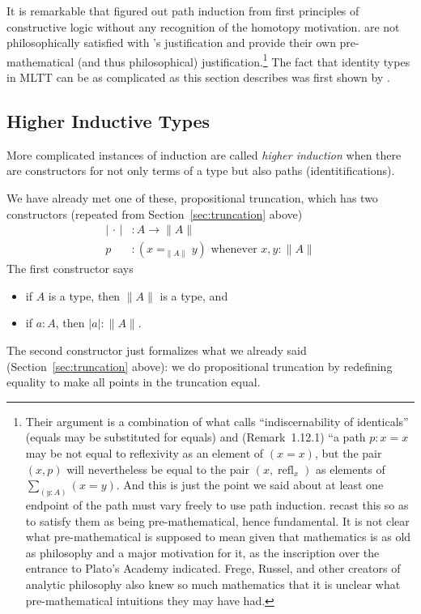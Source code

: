 \documentclass[11pt]{article}
\DeclareMathOperator{\refl}{refl}
\newcommand{\proptrunc}[1]{\lVert #1 \rVert}
\newcommand{\termtrunc}[1]{\lvert #1 \rvert}
\newcommand{\fatdot}{\,\cdot\,}
\begin{document}
It is remarkable that \citet{martin-lof-mltt} figured out path induction
from first principles of constructive logic without any recognition of
the homotopy motivation.  \citet{ladyman-presnell} are not philosophically
satisfied with \citeauthor{martin-lof-mltt}'s justification and provide
their own pre-mathematical (and thus philosophical)
justification.\footnote{Their argument is a combination of what
 calls ``indiscernability of identicals''
(equals may be substituted for equals) and (Remark~1.12.1) ``a path
$p : x = x$ may be not equal to reflexivity as an element of $( x = x )$,
but the pair $(x, p)$ will nevertheless be equal to the pair $(x, \refl_x)$
as elements of $\sum_{(y:A)} (x = y)$.  And this is just the point we said
about at least one endpoint of the path must vary freely to use path induction.
\citeauthor{ladyman-presnell} recast this so as to satisfy them as being
pre-mathematical, hence fundamental.  It is not clear what pre-mathematical
is supposed to mean given that mathematics is as old as philosophy and a major
motivation for it, as the inscription
over the entrance to Plato's Academy indicated.
Frege, Russel, and other creators of analytic philosophy also knew so much
mathematics that it is unclear what pre-mathematical intuitions they may
have had.}
The fact that identity types in MLTT can be as complicated as this
section describes was first shown by \citet{hofmann-streicher}.

\subsection{Higher Inductive Types}
\label{sec:higher-induction}

More complicated instances of induction are called \emph{higher induction}
when there are constructors for not only terms of a type but also paths
(identitifications).

We have already met one of these, propositional truncation,
which has two constructors (repeated from Section~\ref{sec:truncation} above)
\begin{align*}
   \termtrunc{\fatdot} & : A \to \proptrunc{A}
   \\
   p & : \text{$(x =_{\proptrunc{A}} y)$ whenever $x, y : \proptrunc{A}$}
\end{align*}
The first constructor says\
\begin{itemize}
\item if $A$ is a type, then $\proptrunc{A}$ is a type, and
\item if $a : A$, then $\termtrunc{a} : \proptrunc{A}$.
\end{itemize}
The second constructor just formalizes what we already said
(Section~\ref{sec:truncation} above):
we do propositional truncation by redefining
equality to make all points in the truncation equal.
\end{document}
